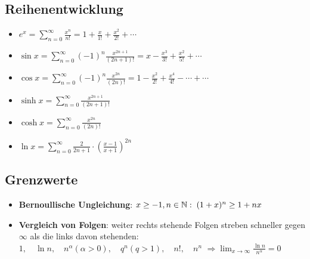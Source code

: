 \subsection{Reihenentwicklung}
\begin{itemize}[leftmargin=*]
	\item $e^x = \sum_{n=0}^\infty \frac{x^n}{n!} = 1 + \frac{x}{1!} +
	\frac{x^2}{2!} + \cdots$
	\item $\sin x = \sum_{n=0}^\infty (-1)^n \frac{x^{2n + 1}}{(2n + 1)!} = x -
	\frac{x^3}{3!} + \frac{x^2}{5!} + \cdots$
	\item $\cos x = \sum_{n=0}^\infty (-1)^n \frac{x^{2n}}{(2n)!} = 1 -
	\frac{x^2}{2!} + \frac{x^4}{4!} - \cdots + \cdots$
	\item $\sinh x = \sum_{n=0}^\infty \frac{x^{2n+1}}{(2n + 1)!}$
	\item $\cosh x = \sum_{n=0}^\infty \frac{x^{2n}}{(2n)!}$
	\item $\ln x = \sum_{n=0}^\infty \frac{2}{2n + 1} \cdot \left(
	\frac{x-1}{x+1} \right)^{2n}$
\end{itemize}

\subsection{Grenzwerte}
\begin{itemize}[leftmargin=*]
	\item \textbf{Bernoullische Ungleichung}: $x \geq -1, n \in \mathbb{N}: \; (1+x)^n \geq
	1+nx$
	\item \textbf{Vergleich von Folgen}: weiter rechts stehende Folgen streben
	schneller gegen $\infty$ als die links davon stehenden: $1, \quad \ln n, \quad
	n^\alpha (\alpha > 0), \quad q^n (q > 1), \quad n!, \quad n^n$ $\Rightarrow
	\lim_{x \to \infty} \frac{\ln n}{n^\alpha} = 0$
\end{itemize}
